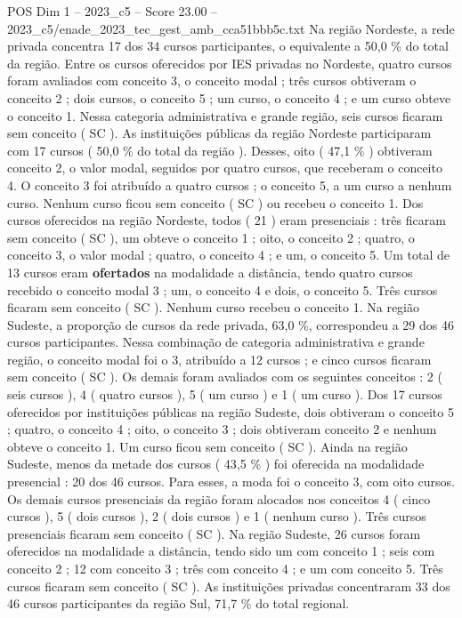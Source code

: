 \begin{textsample}{POS Dim 1 – 2023\_c5 – Score 23.00 – 2023\_c5/enade\_2023\_tec\_gest\_amb\_cca51bbb5c.txt}
Na região Nordeste, a rede privada concentra 17 dos 34 cursos participantes, o equivalente a 50,0 \% do total da região.
Entre os cursos oferecidos por IES privadas no Nordeste, quatro cursos foram avaliados com conceito 3, o conceito modal ; três cursos obtiveram o conceito 2 ; dois cursos, o conceito 5 ; um curso, o conceito 4 ; e um curso obteve o conceito 1.
Nessa categoria administrativa e grande região, seis cursos ficaram sem conceito ( SC ).
As instituições públicas da região Nordeste participaram com 17 cursos ( 50,0 \% do total da região ).
Desses, oito ( 47,1 \% ) obtiveram conceito 2, o valor modal, seguidos por quatro cursos, que receberam o conceito 4.
O conceito 3 foi atribuído a quatro cursos ; o conceito 5, a um curso a nenhum curso.
Nenhum curso ficou sem conceito ( SC ) ou recebeu o conceito 1.
Dos cursos oferecidos na região Nordeste, todos ( 21 ) eram presenciais : três ficaram sem conceito ( SC ), um obteve o conceito 1 ; oito, o conceito 2 ; quatro, o conceito 3, o valor modal ; quatro, o conceito 4 ; e um, o conceito 5.
Um total de 13 cursos eram \textbf{ofertados} na modalidade a distância, tendo quatro cursos recebido o conceito modal 3 ; um, o conceito 4 e dois, o conceito 5.
Três cursos ficaram sem conceito ( SC ).
Nenhum curso recebeu o conceito 1.
Na região Sudeste, a proporção de cursos da rede privada, 63,0 \%, correspondeu a 29 dos 46 cursos participantes.
Nessa combinação de categoria administrativa e grande região, o conceito modal foi o 3, atribuído a 12 cursos ; e cinco cursos ficaram sem conceito ( SC ).
Os demais foram avaliados com os seguintes conceitos : 2 ( seis cursos ), 4 ( quatro cursos ), 5 ( um curso ) e 1 ( um curso ).
Dos 17 cursos oferecidos por instituições públicas na região Sudeste, dois obtiveram o conceito 5 ; quatro, o conceito 4 ; oito, o conceito 3 ; dois obtiveram conceito 2 e nenhum obteve o conceito 1.
Um curso ficou sem conceito ( SC ).
Ainda na região Sudeste, menos da metade dos cursos ( 43,5 \% ) foi oferecida na modalidade presencial : 20 dos 46 cursos.
Para esses, a moda foi o conceito 3, com oito cursos.
Os demais cursos presenciais da região foram alocados nos conceitos 4 ( cinco cursos ), 5 ( dois cursos ), 2 ( dois cursos ) e 1 ( nenhum curso ).
Três cursos presenciais ficaram sem conceito ( SC ).
Na região Sudeste, 26 cursos foram oferecidos na modalidade a distância, tendo sido um com conceito 1 ; seis com conceito 2 ; 12 com conceito 3 ; três com conceito 4 ; e um com conceito 5.
Três cursos ficaram sem conceito ( SC ).
As instituições privadas concentraram 33 dos 46 cursos participantes da região Sul, 71,7 \% do total regional.

\end{textsample}
